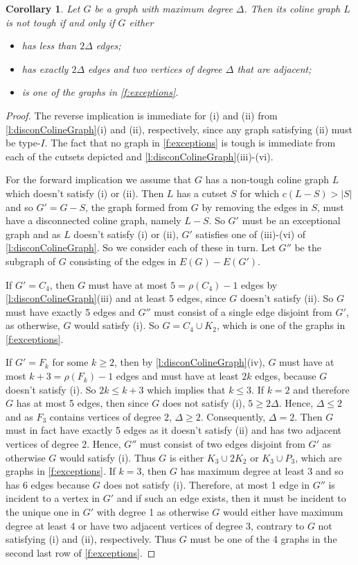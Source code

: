 \documentclass[12pt]{article}
\newtheorem{cor}[thm]{Corollary}
\theoremstyle{definition}
\begin{document}
\begin{cor}\label{c:exceptions}
Let $G$ be a graph with maximum degree $\Delta$. Then its coline graph $L$ is not tough if and only if $G$ either 
\begin{itemize}
\item[(i)]has less than $2\Delta$ edges;
\item[(ii)] has exactly $2\Delta$ edges and two vertices of degree $\Delta$ that are adjacent;
\item[(iii)]is one of the graphs in \cref{f:exceptions}.
\end{itemize}
\end{cor}
\begin{proof}
The reverse implication is immediate for (i) and (ii) from \cref{l:disconColineGraph}(i) and (ii), respectively, since any graph satisfying (ii) must be type-$I$. The fact that no graph in \cref{f:exceptions} is tough is immediate from each of the cutsets depicted  and \cref{l:disconColineGraph}(iii)-(vi).

For the forward implication we assume that $G$ has a non-tough coline graph $L$ which doesn't satisfy (i) or (ii).
Then $L$ has a cutset $S$ for which $c(L-S) >|S|$ and so  $G'=G-S$, the graph formed from $G$ by removing the edges in $S$, must have a disconnected coline graph, namely $L-S$.
So $G'$ must be an exceptional graph and as $L$ doesn't satisfy (i) or (ii), $G'$ satisfies one of (iii)-(vi) of \cref{l:disconColineGraph}.
So we consider each of these in turn. Let $G''$ be the subgraph of $G$ consisting of the edges in $E(G)-E(G')$. 

If $G'=C_4$, then $G$ must have at most $5 = \rho(C_4)-1$ edges by \cref{l:disconColineGraph}(iii) and at least 5 edges, since $G$ doesn't satisfy (ii). So $G$ must have exactly 5 edges and $G''$ must consist of a single edge disjoint from $G'$, as otherwise, $G$ would satisfy (i). So $G=C_4 \cup K_2$, which is one of the graphs in \cref{f:exceptions}.

If $G' = F_k$ for some $k \geq 2$, then by \cref{l:disconColineGraph}(iv), $G$ must have at most $k+3=\rho(F_k)-1$ edges and must have at least $2k $ edges, because $G$ doesn't satisfy (i). 
So $2k\leq k+3$ which implies that $k \leq 3$. 
If $k=2$ and therefore $G$ has at most 5 edges, then  since $G$ does not satisfy (i), $5 \geq 2\Delta$. Hence, $\Delta \leq 2$ and as $F_3$ contains vertices of degree $2$, $\Delta \geq 2$. Consequently, $\Delta=2$. Then $G$ must in fact have exactly 5 edges as it doesn't satisfy (ii) and has two adjacent vertices of degree 2.
Hence,  $G''$ must consist of two edges disjoint from $G'$ as otherwise $G$ would satisfy (i). Thus $G$ is either $K_3 \cup 2K_2$ or $K_3 \cup P_3$, which are graphs in \cref{f:exceptions}. 
If $k=3$, then $G$ has maximum degree at least 3 and so has 6 edges because $G$ does not satisfy (i). 
Therefore, at most 1 edge in $G''$ is incident to a vertex in $G'$ and if such an edge exists, then it must be incident to the unique one in $G'$ with degree 1 as otherwise $G$ would either have maximum degree at least 4 or have two adjacent vertices of degree 3, contrary to $G$ not satisfying (i) and (ii), respectively. 
Thus $G$ must be one of the 4 graphs in the second last row of \cref{f:exceptions}.


\end{proof}
\end{document}
